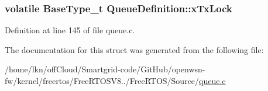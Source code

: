 \subsubsection[{\texorpdfstring{x\+Tx\+Lock}{xTxLock}}]{\setlength{\rightskip}{0pt plus 5cm}volatile {\bf Base\+Type\+\_\+t} Queue\+Definition\+::x\+Tx\+Lock}\hypertarget{struct_queue_definition_a96013417532d70900fb608f5926d8043}{}\label{struct_queue_definition_a96013417532d70900fb608f5926d8043}


Definition at line 145 of file queue.\+c.



The documentation for this struct was generated from the following file\+:\begin{DoxyCompactItemize}
\item 
/home/lkn/off\+Cloud/\+Smartgrid-\/code/\+Git\+Hub/openwsn-\/fw/kernel/freertos/\+Free\+R\+T\+O\+S\+V8../\+Free\+R\+T\+O\+S/\+Source/\hyperlink{queue_8c}{queue.\+c}\end{DoxyCompactItemize}
